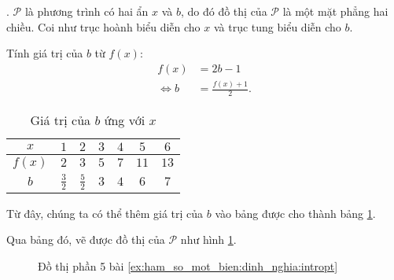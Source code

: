 {
   \begin{minipageindent}{0.48\textwidth}
      . $\mathcal{P}$ là phương trình có hai ẩn $x$ và $b$, do đó đồ thị của $\mathcal{P}$ là một mặt phẳng hai chiều. Coi như trục hoành biểu diễn cho $x$ và trục tung biểu diễn cho $b$.

      Tính giá trị của $b$ từ $f(x)$:
      \begin{align*}
         f(x) &= 2b - 1 \\
         \iff b &= \frac{f(x) + 1}{2}.
      \end{align*}
   \end{minipageindent}
   \hfill
   \begin{minipageindent}{0.48\textwidth}
      \begin{table}[H]
         \centering
         \begin{tabular}{|c|c|c|c|c|c|c|}
            \hline
            $x$ & $1$ & $2$ & $3$ & $4$ & $5$ & $6$\\
            \hline
            $f(x)$ & $2$ & $3$ & $5$ & $7$ & $11$ & $13$\\
            \hline
            $b$ & $\frac{3}{2}$ & $\frac{5}{2}$ & $3$ & $4$ & $6$ & $7$\\
            \hline
         \end{tabular}
         \caption{Giá trị của $b$ ứng với $x$}
         \label{tab:ham_so_mot_bien:dinh_nghia:b_values6}
      \end{table}
   \end{minipageindent}
}
Từ đây, chúng ta có thể thêm giá trị của $b$ vào bảng được cho thành bảng \ref{tab:ham_so_mot_bien:dinh_nghia:b_values6}. 

Qua bảng đó, vẽ được đồ thị của $\mathcal{P}$ như hình \ref{fig:ham_so_mot_bien:dinh_nghia:dtp5}.


\begin{figure}[H]
   \centering
   \caption{Đồ thị phần 5 bài \ref{ex:ham_so_mot_bien:dinh_nghia:intropt}}
   \label{fig:ham_so_mot_bien:dinh_nghia:dtp5}
\end{figure}

